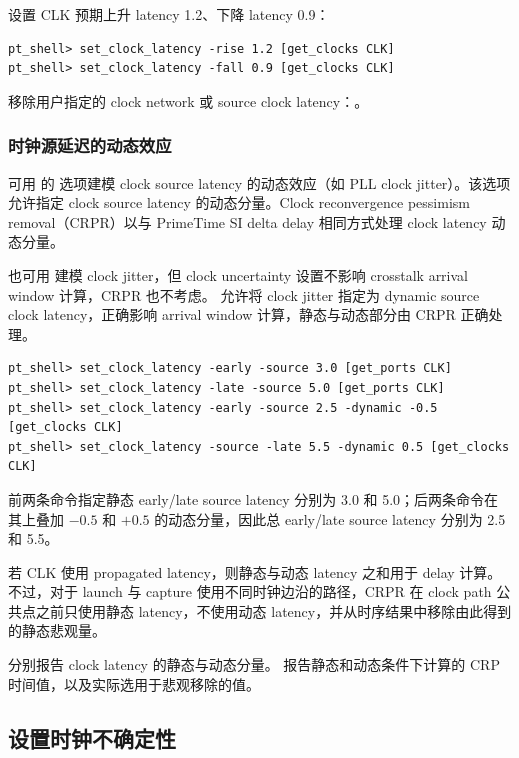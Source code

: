
设置 CLK 预期上升 latency 1.2、下降 latency 0.9：
\begin{lstlisting}
pt_shell> set_clock_latency -rise 1.2 [get_clocks CLK]
pt_shell> set_clock_latency -fall 0.9 [get_clocks CLK]
\end{lstlisting}

移除用户指定的 clock network 或 source clock latency：。

\subsubsection{时钟源延迟的动态效应}
可用  的  选项建模 clock source latency 的动态效应（如 PLL clock jitter）。该选项允许指定 clock source latency 的动态分量。Clock reconvergence pessimism removal（CRPR）以与 PrimeTime SI delta delay 相同方式处理 clock latency 动态分量。

也可用  建模 clock jitter，但 clock uncertainty 设置不影响 crosstalk arrival window 计算，CRPR 也不考虑。 允许将 clock jitter 指定为 dynamic source clock latency，正确影响 arrival window 计算，静态与动态部分由 CRPR 正确处理。

\begin{lstlisting}
pt_shell> set_clock_latency -early -source 3.0 [get_ports CLK]
pt_shell> set_clock_latency -late -source 5.0 [get_ports CLK]
pt_shell> set_clock_latency -early -source 2.5 -dynamic -0.5 [get_clocks CLK]
pt_shell> set_clock_latency -source -late 5.5 -dynamic 0.5 [get_clocks CLK]
\end{lstlisting}

前两条命令指定静态 early/late source latency 分别为 3.0 和 5.0；后两条命令在其上叠加 $-0.5$ 和 $+0.5$ 的动态分量，因此总 early/late source latency 分别为 2.5 和 5.5。

若 CLK 使用 propagated latency，则静态与动态 latency 之和用于 delay 计算。不过，对于 launch 与 capture 使用不同时钟边沿的路径，CRPR 在 clock path 公共点之前只使用静态 latency，不使用动态 latency，并从时序结果中移除由此得到的静态悲观量。

 分别报告 clock latency 的静态与动态分量。 报告静态和动态条件下计算的 CRP 时间值，以及实际选用于悲观移除的值。

\subsection{设置时钟不确定性}
